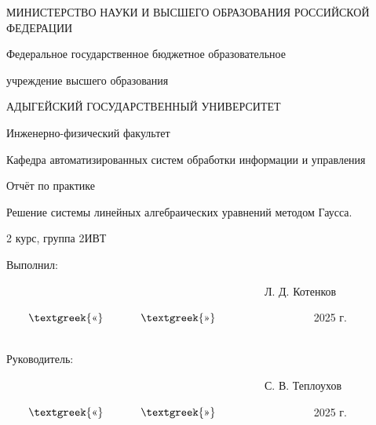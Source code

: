 \documentclass{article}
\date{2025-06-04}
\begin{document}
МИНИСТЕРСТВО НАУКИ И ВЫСШЕГО ОБРАЗОВАНИЯ РОССИЙСКОЙ ФЕДЕРАЦИИ

Федеральное государственное бюджетное образовательное

учреждение высшего образования

АДЫГЕЙСКИЙ ГОСУДАРСТВЕННЫЙ УНИВЕРСИТЕТ


\bigskip

Инженерно-физический факультет

Кафедра автоматизированных систем обработки информации и управления


\bigskip


\bigskip


\bigskip

Отчёт по практике

Решение системы линейных алгебраических уравнений методом Гаусса.


\bigskip

2 курс, группа 2ИВТ


\bigskip


\bigskip


\bigskip


\bigskip


\bigskip


\bigskip

Выполнил: \ \ \ \ \ \ \ \ \ \ \ \ \ \ \ \ \ \ \ \ \ \ \ \ \ \ \ \ \ \ \ \ \ \ \ \ \ \ \ \ \ 

\ \ \ \ \ \ \ \ \ \ \ \ \ \  \ \ \ \ \ \ \ \ \ \ \  \ \ \ \ \ \ \ \ \ \ \ \ \ \ \ \ \ \ \ \ \ \ Л. Д. Котенков

\ \ \ \ $\text{\textgreek{«}}$ \ \ \ \ \ \ $\text{\textgreek{»}}$ \ \ \ \ \ \ \ \ \ \ \ \ \ \ \ \ \ 2025 г.
\ \ \ \ \ \ \ \ \ \ \ \ \ \ \ \ \ \ \ 


\bigskip


\bigskip

Руководитель: \ \ \ \ \ \ \ \ \ \ \ \ \ \ \ \ \ \ \ \ \ \ \ \ \ \ \ \ \ \ \ \ \ \ \ \ 

\ \ \ \ \ \ \ \ \ \ \ \ \ \  \ \ \ \ \ \ \ \ \ \ \  \ \ \ \ \ \ \ \ \ \ \ \ \ \ \ \ \ \ \ \ \ \ С. В. Теплоухов

\ \ \ \ $\text{\textgreek{«}}$ \ \ \ \ \ \ $\text{\textgreek{»}}$ \ \ \ \ \ \ \ \ \ \ \ \ \ \ \ \ \ 2025 г.
\ \ \ \ \ \ \ \ \ \ \ \ \ \ \ \ \ \ \ 


\bigskip


\bigskip


\bigskip


\bigskip


\bigskip
\end{document}
